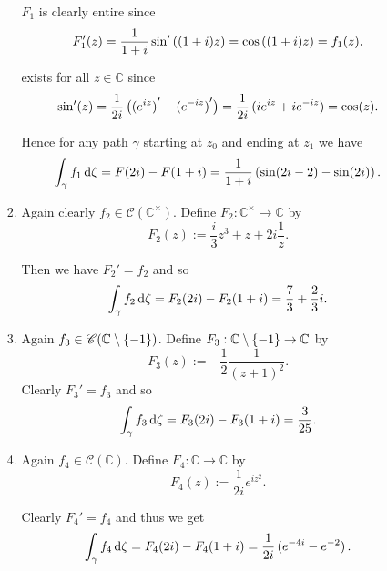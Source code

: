 \begin{enumerate}[label = \textbf{Exercise \arabic*.},wide = 0pt, itemsep=1.5ex]
\begin{enumerate}[label = (\alph*),wide = 0pt, itemsep=1.5ex]
\begin{enumerate}[label = (\roman*),wide = 0pt, itemsep=1.5ex]
						$F_1$ is clearly entire since
						\begin{equation}
							F_1'(z) = \frac{1}{1 + i}\sin'\del[0]{(1 + i)z} = \cos\del[0]{(1 + i)z} = f_1(z).
						\end{equation}

						\noindent exists for all $z \in \mathbb{C}$ since 
						\begin{equation}
							\sin'(z) = \frac{1}{2i}\del[1]{\del[0]{e^{iz}}' - \del[0]{e^{-iz}}'} = \frac{1}{2i}\del[0]{ie^{iz} + ie^{-iz}} = \cos(z).
						\end{equation}

						Hence for any path $\gamma$ starting at $z_0$ and ending at $z_1$ we have
						\begin{equation}
							\int_\gamma f_1 \d \zeta = F(2i) - F(1 + i) = \frac{1}{1 + i}\del[0]{\sin(2i - 2) - \sin(2i)}. 
						\end{equation}
					\item Again clearly $f_2 \in \mathscr{C}(\mathbb{C}^\times)$. Define $F_2: \mathbb{C}^\times \to \mathbb{C}$ by
						\begin{equation}
							F_2(z) := \frac{i}{3}z^3 + z + 2i\frac{1}{z}.
						\end{equation}

						Then we have $F_2' = f_2$ and so
						\begin{equation}
							\int_\gamma f_2 \mathop{}\!\mathrm{d} \zeta = F_2(2i) - F_2(1 + i) = \frac{7}{3} + \frac{2}{3}i.
						\end{equation}
					\item Again $f_3 \in \mathscr{C}(\mathbb{C} \setminus \cbr[0]{-1})$. Define $F_3: \mathbb{C} \setminus \cbr[0]{-1} \to \mathbb{C}$ by
						\begin{equation}
							F_3(z) := -\frac{1}{2}\frac{1}{(z + 1)^2}.
						\end{equation}
						Clearly $F_3' = f_3$ and so
						\begin{equation}
							\int_\gamma f_3 \mathop{}\!\mathrm{d} \zeta = F_3(2i) - F_3(1 + i) = \frac{3}{25}. 
						\end{equation}

					\item Again $f_4 \in \mathscr{C}(\mathbb{C})$. Define $F_4: \mathbb{C} \to \mathbb{C}$ by
						\begin{equation}
							F_4(z) := \frac{1}{2i}e^{iz^2}.
						\end{equation}

						Clearly $F_4' = f_4$ and thus we get
						\begin{equation}
							\int_\gamma f_4 \d \zeta = F_4(2i) - F_4(1 + i) = \frac{1}{2i}\del[0]{e^{-4i} - e^{-2}}.
						\end{equation}
				\end{enumerate}
		\end{enumerate}


\end{enumerate}
